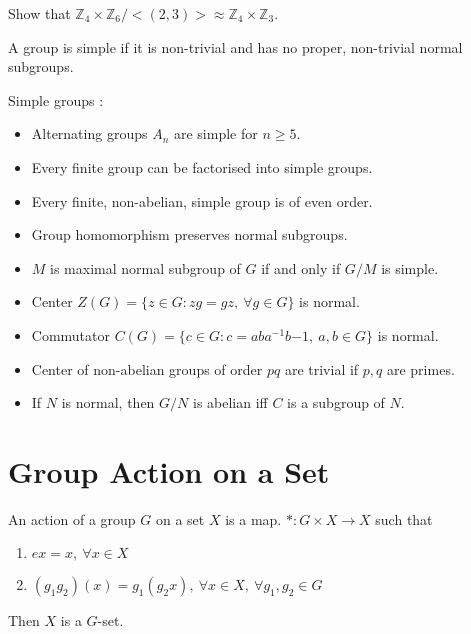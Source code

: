 \begin{question}
	Show that $\mathbb{Z}_4 \times \mathbb{Z}_6 / <(2,3)> \approx \mathbb{Z}_4 \times \mathbb{Z}_3$.
\end{question}

\begin{definition}
	A group is simple if it is non-trivial and has no proper, non-trivial normal subgroups.
\end{definition}

\begin{remark} Simple groups :
	\begin{itemize}
		\item Alternating groups $A_n$ are simple for $n \ge 5$. %
		\item Every finite group can be factorised into simple groups. %
		\item Every finite, non-abelian, simple group is of even order. %
		\item Group homomorphism preserves normal subgroups. %
		\item $M$ is maximal normal subgroup of $G$ if and only if $G/M$ is simple. %
		\item Center $Z(G) = \{ z \in G : zg = gz,\ \forall g \in G \}$ is normal. %
		\item Commutator $C(G) = \{ c \in G : c = aba^{-1}b{-1},\ a,b \in G \}$ is normal. %
		\item Center of non-abelian groups of order $pq$ are trivial if $p,q$ are primes. %
		\item If $N$ is normal, then $G/N$ is abelian iff $C$ is a subgroup of $N$. %
	\end{itemize}
\end{remark}


\section{Group Action on a Set}
\begin{definition}%
	An action of a group $G$ on a set $X$ is a map.
	$\ast : G \times X \to X$ such that
	\begin{enumerate}
		\item $ex = x,\ \forall x \in X$
		\item $(g_1g_2)(x) = g_1(g_2x),\ \forall x \in X,\ \forall g_1,g_2 \in G$
	\end{enumerate}
	Then $X$ is a $G$-set.
\end{definition}

